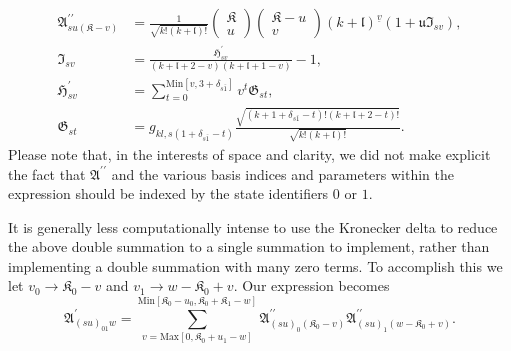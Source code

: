 \begin{align}
\mathfrak{A}_{su\left(\mathfrak{K}-v\right)}^{\prime\prime}
    &=
        \frac{1}{\sqrt{k!\left(k+\mathfrak{l}\right)!}}
        \begin{pmatrix}\mathfrak{K}\\u\end{pmatrix}
        \begin{pmatrix}\mathfrak{K}-u\\v\end{pmatrix}
        \left(k+\mathfrak{l}\right)^{\underline{v}}
        \left(1 + \mathfrak{u}\mathfrak{I}_{sv}\right)
\label{appendix:elements:precalc-coeffs-2}
,\\
\mathfrak{I}_{sv}
    &=
        \frac
        { \mathfrak{H}_{sv}^{\prime} }
        { \left(k+\mathfrak{l}+2-v\right)\left(k+\mathfrak{l}+1-v\right) }
            -
        1
\label{appendix:elements:precalc-coeffs-3}
,\\
\mathfrak{H}_{sv}^{\prime}
    &=
        \sum
        _{t=0}
        ^{\text{Min}\left[v,3+\delta_{s\bar{1}}\right]}
        v^{t}
        \mathfrak{G}_{st}
\label{appendix:elements:precalc-coeffs-4}
,\\
\mathfrak{G}_{st}
    &=
        g_{kl,s\left(1+\delta_{s\bar{1}}-t\right)}
        \frac
        {
            \sqrt
            {
                \left(k+1+\delta_{s\bar{1}}-t\right)!
                \left(k+\mathfrak{l}+2-t\right)!
            }
        }
        {
            \sqrt{k!\left(k+\mathfrak{l}\right)!}
        }
.
\label{appendix:elements:precalc-coeffs-5}
\end{align}
Please note that, in the interests of space and clarity, we did not make
explicit the fact that $\mathfrak{A}^{\prime\prime}$ and the various basis
indices and parameters within the expression should be indexed by the state
identifiers $0$ or $1$. 

It is generally less computationally intense to use the Kronecker delta to
reduce the above double summation to a single summation to implement, rather
than implementing a double summation with many zero terms. To accomplish this we
let $v_{0} \rightarrow \mathfrak{K}_{0}-v$ and $v_{1} \rightarrow
w-\mathfrak{K}_{0}+v$. Our expression becomes
\begin{equation}
\mathfrak{A}_{\left(su\right)_{01}w}^{\prime}
    =
        \sum
        _{v = \text{Max}\left[0,\mathfrak{K}_{0}+u_{1}-w\right]}
        ^{\text{Min}\left[
            \mathfrak{K}_{0}-u_{0},\mathfrak{K}_{0}+\mathfrak{K}_{1}-w
        \right]}
        \mathfrak{A}
        _{\left(su\right)_{0}\left(\mathfrak{K}_{0}-v\right)}
        ^{\prime\prime}
        \mathfrak{A}
        _{
            \left(su\right)_{1}
            \left(w-\mathfrak{K}_{0}+v\right)
        }
        ^{\prime\prime}
\label{appendix:elements:precalc-coeffs-1}
.
\end{equation}

